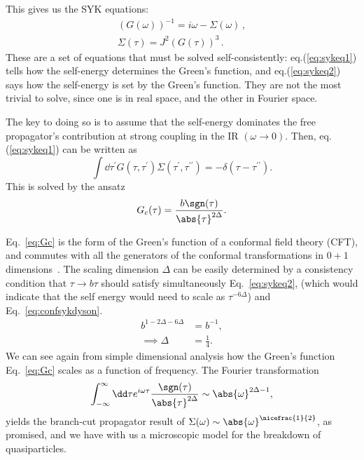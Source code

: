 \par
This gives us the SYK equations: 
\begin{align}
    \left(G(\omega)\right)^{-1} = i\omega - \Sigma(\omega) \, ,\label{eq:sykeq1} \\ 
    \Sigma(\tau) = J^2\left(G(\tau)\right)^3 \,.\label{eq:sykeq2}
\end{align}
These are a set of equations that must be solved self-consistently: eq.(\ref{eq:sykeq1}) tells how the self-energy determines the Green's function, and eq.(\ref{eq:sykeq2}) says how the self-energy is set by the Green's function. 
They are not the most trivial to solve, since one is in real space, and the other in Fourier space. 
  

\par
The key to doing so is to assume that the self-energy dominates the free propagator's contribution at strong coupling in the IR $(\omega \xrightarrow{} 0)$.
Then, eq.(\ref{eq:sykeq1}) can be written as
\begin{equation}
    \int \dd\tau^\prime G(\tau,\tau^\prime)\Sigma(\tau^\prime,\tau^{\prime\prime}) = -\delta(\tau - \tau^{\prime\prime}) .
    \label{eq:confsykdyson}
\end{equation}
This is solved by the ansatz
\begin{equation}
    G_c(\tau) = \frac{b\sgn(\tau)}{\abs{\tau}^{2\Delta}} .
    \label{eq:Gc}
\end{equation}

\par
Eq.~\eqref{eq:Gc} is the form of the Green's function of a conformal field theory (CFT), and commutes with all the generators of the conformal transformations in $0+1$ dimensions~\cite{schellekens1995conformal}. The scaling dimension $\Delta$ can be easily determined by a consistency condition that $\tau \xrightarrow{} b\tau$ should satisfy simultaneously Eq.~\eqref{eq:sykeq2}, (which would indicate that the self energy would need to scale as $\tau^{-6\Delta}$) and Eq.~\eqref{eq:confsykdyson}. 
\begin{align}
    b^{1 - 2\Delta - 6\Delta} &= b^{-1} ,\nonumber \\
    \implies \Delta &= \frac{1}{4} .
\end{align}
We can see again from simple dimensional analysis how the Green's function Eq.~\eqref{eq:Gc} scales as a function of frequency. The Fourier transformation
\begin{equation}
    \int_{-\infty}^\infty \dd\tau e^{i\omega\tau} \frac{\sgn(\tau)}{\abs{\tau}^{2\Delta}} \sim \abs{\omega}^{2\Delta-1},
\end{equation}
yields the branch-cut propagator result of $\Sigma(\omega)\sim \abs{\omega}^{\nicefrac{1}{2}} $, as promised, and we have with us a microscopic model for the breakdown of quasiparticles.  

